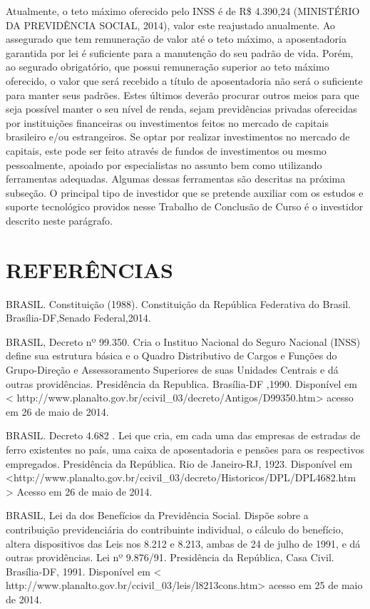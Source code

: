 \begin{apendicesenv}
Atualmente, o teto máximo oferecido pelo INSS é de R\$ 4.390,24 (MINISTÉRIO DA PREVIDÊNCIA SOCIAL, 2014), valor este reajustado anualmente. Ao assegurado que tem remuneração de valor até o teto máximo, a aposentadoria garantida por lei é suficiente para a manutenção do seu padrão de vida. Porém, ao segurado obrigatório, que possui remuneração superior ao teto máximo oferecido, o valor que será recebido a título de aposentadoria não será o suficiente para manter seus padrões. Estes últimos deverão procurar outros meios para que seja possível manter o seu nível de renda, sejam previdências privadas oferecidas por instituições financeiras ou investimentos feitos no mercado de capitais brasileiro e/ou estrangeiros. Se optar por realizar investimentos no mercado de capitais, este pode ser feito através de fundos de investimentos ou mesmo pessoalmente, apoiado por especialistas no assunto bem como utilizando ferramentas adequadas. Algumas dessas ferramentas são descritas na próxima subseção. O principal tipo de investidor que se pretende auxiliar com os estudos e suporte tecnológico providos nesse Trabalho de Conclusão de Curso é o investidor descrito neste parágrafo.

\section*{REFERÊNCIAS}

BRASIL. Constituição (1988). Constituição da República Federativa do Brasil. Brasília-DF,Senado Federal,2014.

BRASIL, Decreto nº 99.350. Cria o Instituo Nacional do Seguro Nacional (INSS) define sua estrutura básica e o Quadro Distributivo de Cargos e Funções do Grupo-Direção e Assessoramento Superiores de suas Unidades Centrais e dá outras providências. Presidência da Republica. Brasília-DF ,1990. Disponível em < http://www.planalto.gov.br/ccivil\_03/decreto/Antigos/D99350.htm> acesso em 26 de maio de 2014.

BRASIL. Decreto 4.682 . Lei que cria, em cada uma das empresas de estradas de ferro existentes no país, uma caixa de aposentadoria e pensões para os respectivos empregados. Presidência da República. Rio de Janeiro-RJ, 1923. Disponível em <http://www.planalto.gov.br/ccivil\_03/decreto/Historicos/DPL/DPL4682.htm > Acesso em 26 de maio de 2014.

BRASIL, Lei da dos Benefícios da Previdência Social. Dispõe sobre a contribuição previdenciária do contribuinte individual, o cálculo do benefício, altera dispositivos das Leis nos 8.212 e 8.213, ambas de 24 de julho de 1991, e dá outras providências. Lei nº 9.876/91. Presidência da República, Casa Civil. Brasília-DF, 1991. Disponível em < http://www.planalto.gov.br/ccivil\_03/leis/l8213cons.htm> acesso em 25 de maio de 2014.


\end{apendicesenv}
